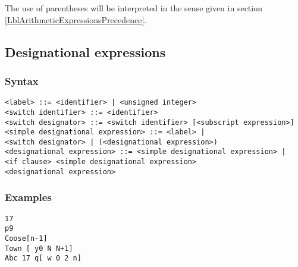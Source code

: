 \documentclass[a4paper,11pt]{article}
\begin{document}
The use of parentheses will be interpreted in the sense given in
section \ref{LblArithmeticExpressionsPrecedence}.



\subsection{Designational expressions}
\label{LblDesignationalExpressions}


\subsubsection{Syntax}
\label{LblDesignationalExpressionsSyntax}

\begin{flushleft}
\vspace{0.2em}\texttt{<label> ::= <identifier> | <unsigned integer>}\\

\vspace{0.2em}\texttt{<switch identifier> ::= <identifier>}\\

\vspace{0.2em}\texttt{<switch designator> ::= <switch identifier> [<subscript expression>]}\\

\vspace{0.2em}\texttt{<simple designational expression> ::= <label> |\\
  \hspace{1.0cm}<switch designator> | (<designational expression>)}\\

\vspace{0.2em}\texttt{<designational expression> ::= <simple designational expression> |\\
  \hspace{1.0cm}<if clause> <simple designational expression>\\
  \hspace{1.0cm} <designational expression>}\\
\end{flushleft}

\subsubsection{Examples}

\begin{flushleft}
\texttt{17\\
p9\\
Coose[n-1]\\
Town [ y\mlt{}0  N  N+1]\\
 Ab\mlt{}c  17  q[ w \mle{} 0  2  n]}\\
\end{flushleft}
\end{document}
